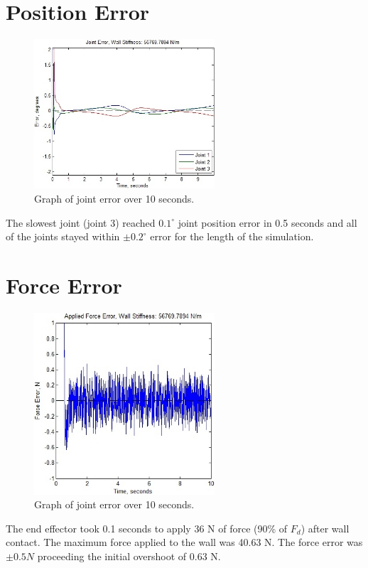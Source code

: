 \documentclass[letterpaper,12pt]{report}
\begin{document}
\section{Position Error}
\begin{figure}[h!b]
\centering
\includegraphics[width=0.6\textwidth]{JointError}
\caption{Graph of joint error over 10 seconds.}
\label{fig:JointError}
\end{figure}
The slowest joint (joint 3) reached $0.1^\circ$ joint position error in 0.5 seconds and all of the joints stayed within $\pm 0.2^\circ$ error
for the length of the simulation.

\section{Force Error}
\begin{figure}[h!b]
\centering
\includegraphics[width=0.6\textwidth]{AppliedForceError}
\caption{Graph of joint error over 10 seconds.}
\label{fig:ForceError}
\end{figure}
The end effector took 0.1 seconds to apply 36 N of force (90\% of $F_d$) after wall contact. The maximum force applied to the wall was 40.63 N. The force
error was $\pm 0.5 N$ proceeding the initial overshoot of 0.63 N.
\end{document}
